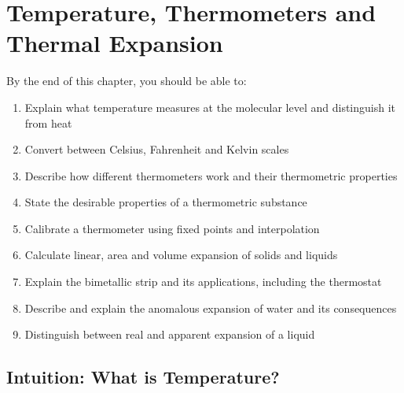 %

\chapter{Temperature, Thermometers and Thermal Expansion}
\label{ch:temperature_expansion}
\minitoc
\newpage


\begin{objectivebox}
By the end of this chapter, you should be able to:
\begin{enumerate}[noitemsep]
  \item Explain what temperature measures at the
  molecular level and distinguish it from heat
  \item Convert between Celsius, Fahrenheit and
  Kelvin scales
  \item Describe how different thermometers work
  and their thermometric properties
  \item State the desirable properties of a
  thermometric substance
  \item Calibrate a thermometer using fixed points
  and interpolation
  \item Calculate linear, area and volume expansion
  of solids and liquids
  \item Explain the bimetallic strip and its
  applications, including the thermostat
  \item Describe and explain the anomalous expansion
  of water and its consequences
  \item Distinguish between real and apparent
  expansion of a liquid
\end{enumerate}
\end{objectivebox}

\section{Intuition: What is Temperature?}

